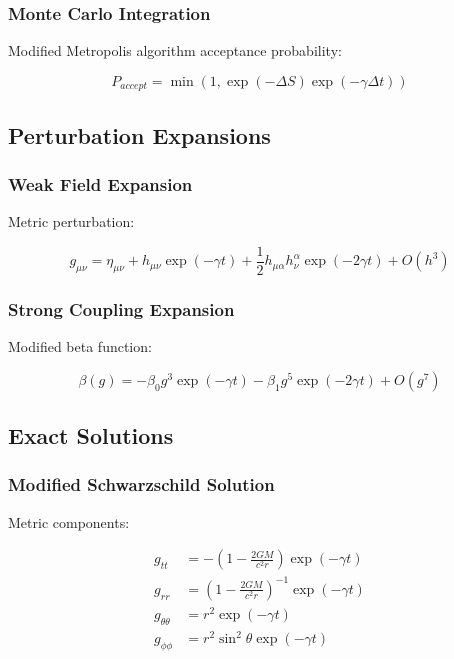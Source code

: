 \documentclass[12pt]{article}
\theoremstyle{plain}
\theoremstyle{definition}
\theoremstyle{remark}
\begin{document}
\subsubsection{Monte Carlo Integration}

Modified Metropolis algorithm acceptance probability:

\begin{equation}
P_{accept} = \min\left(1, \exp(-\Delta S)\exp(-\gamma\Delta t)\right)
\end{equation}

\subsection{Perturbation Expansions}

\subsubsection{Weak Field Expansion}

Metric perturbation:

\begin{equation}
g_{\mu\nu} = \eta_{\mu\nu} + h_{\mu\nu}\exp(-\gamma t) + \frac{1}{2}h_{\mu\alpha}h^{\alpha}_{\nu}\exp(-2\gamma t) + O(h^3)
\end{equation}

\subsubsection{Strong Coupling Expansion}

Modified beta function:

\begin{equation}
\beta(g) = -\beta_0g^3\exp(-\gamma t) - \beta_1g^5\exp(-2\gamma t) + O(g^7)
\end{equation}

\subsection{Exact Solutions}

\subsubsection{Modified Schwarzschild Solution}

Metric components:

\begin{equation}
\begin{aligned}
g_{tt} &= -\left(1 - \frac{2GM}{c^2r}\right)\exp(-\gamma t) \\
g_{rr} &= \left(1 - \frac{2GM}{c^2r}\right)^{-1}\exp(-\gamma t) \\
g_{\theta\theta} &= r^2\exp(-\gamma t) \\
g_{\phi\phi} &= r^2\sin^2\theta\exp(-\gamma t)
\end{aligned}
\end{equation}
\end{document}

